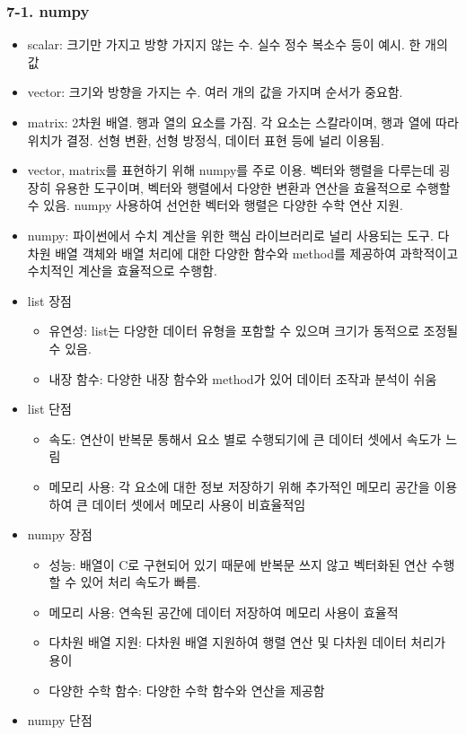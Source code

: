 \hypertarget{numpy}{%
\subsubsection{7-1. numpy}\label{numpy}}

\begin{itemize}
\tightlist
\item
  scalar: 크기만 가지고 방향 가지지 않는 수. 실수 정수 복소수 등이 예시.
  한 개의 값
\item
  vector: 크기와 방향을 가지는 수. 여러 개의 값을 가지며 순서가 중요함.
\item
  matrix: 2차원 배열. 행과 열의 요소를 가짐. 각 요소는 스칼라이며, 행과
  열에 따라 위치가 결정. 선형 변환, 선형 방정식, 데이터 표현 등에 널리
  이용됨.
\item
  vector, matrix를 표현하기 위해 numpy를 주로 이용. 벡터와 행렬을
  다루는데 굉장히 유용한 도구이며, 벡터와 행렬에서 다양한 변환과 연산을
  효율적으로 수행할 수 있음. numpy 사용하여 선언한 벡터와 행렬은 다양한
  수학 연산 지원.
\item
  numpy: 파이썬에서 수치 계산을 위한 핵심 라이브러리로 널리 사용되는
  도구. 다차원 배열 객체와 배열 처리에 대한 다양한 함수와 method를
  제공하여 과학적이고 수치적인 계산을 효율적으로 수행함.
\item
  list 장점

  \begin{itemize}
  \tightlist
  \item
    유연성: list는 다양한 데이터 유형을 포함할 수 있으며 크기가 동적으로
    조정될 수 있음.
  \item
    내장 함수: 다양한 내장 함수와 method가 있어 데이터 조작과 분석이
    쉬움
  \end{itemize}
\item
  list 단점

  \begin{itemize}
  \tightlist
  \item
    속도: 연산이 반복문 통해서 요소 별로 수행되기에 큰 데이터 셋에서
    속도가 느림
  \item
    메모리 사용: 각 요소에 대한 정보 저장하기 위해 추가적인 메모리
    공간을 이용하여 큰 데이터 셋에서 메모리 사용이 비효율적임
  \end{itemize}
\item
  numpy 장점

  \begin{itemize}
  \tightlist
  \item
    성능: 배열이 C로 구현되어 있기 때문에 반복문 쓰지 않고 벡터화된 연산
    수행할 수 있어 처리 속도가 빠름.
  \item
    메모리 사용: 연속된 공간에 데이터 저장하여 메모리 사용이 효율적
  \item
    다차원 배열 지원: 다차원 배열 지원하여 행렬 연산 및 다차원 데이터
    처리가 용이
  \item
    다양한 수학 함수: 다양한 수학 함수와 연산을 제공함
  \end{itemize}
\item
  numpy 단점


\end{itemize}
